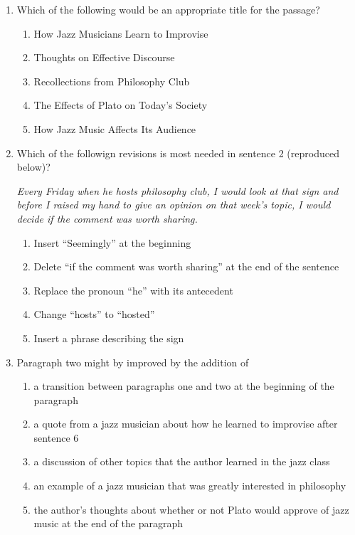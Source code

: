 \begin{enumerate}

\item Which of the following would be an appropriate title for the passage?

\begin{enumerate}[label=(\Alph*)]
\item How Jazz Musicians Learn to Improvise
\item Thoughts on Effective Discourse
\item Recollections from Philosophy Club
\item The Effects of Plato on Today's Society
\item How Jazz Music Affects Its Audience
\end{enumerate}

\item Which of the followign revisions is most needed in sentence 2 (reproduced below)? 

\textit{Every Friday when he hosts philosophy club, I would look at that sign and before I raised my hand to give an opinion on that week’s topic, I would decide if the comment was worth sharing.}
 
\begin{enumerate}[label=(\Alph*)]
\item Insert ``Seemingly'' at the beginning
\item Delete ``if the comment was worth sharing'' at the end of the sentence
\item Replace the pronoun ``he'' with its antecedent 
\item Change ``hosts'' to ``hosted''
\item Insert a phrase describing the sign
\end{enumerate}

\item Paragraph two might by improved by the addition of 
\begin{enumerate}[label=(\Alph*)]
\item a transition between paragraphs one and two at the beginning of the paragraph
\item a quote from a jazz musician about how he learned to improvise after sentence 6
\item a discussion of other topics that the author learned in the jazz class
\item an example of a jazz musician that was greatly interested in philosophy 
\item the author's thoughts about whether or not Plato would approve of jazz music at the end of the paragraph
\end{enumerate}

\end{enumerate}

 
